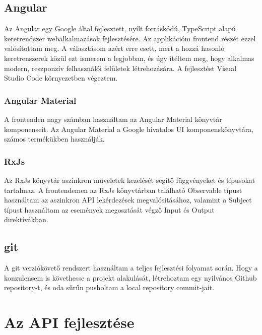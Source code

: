 \documentclass[a4paper,12pt]{report}
\theoremstyle{definition}
\theoremstyle{remark}
\begin{document}
\section{Angular}

Az Angular\cite{Angularwebsite} egy Google által fejlesztett, nyílt forráskódú, TypeScript alapú keretrendszer webalkalmazások fejlesztésére. Az applikációm frontend részét ezzel valósítottam meg. A választásom azért erre esett, mert a hozzá hasonló keretrenszerek közül ezt ismerem a legjobban, és úgy ítéltem meg, hogy alkalmas modern, reszponzív felhasználói felületek létrehozására. A fejlesztést Visual Studio Code\cite{VSCwebsite} környezetben végeztem.

	\subsection{Angular Material}

A frontenden nagy számban használtam az Angular Material\cite{Materialwebsite} könyvtár komponenseit. Az Angular Material a Google hivatalos UI komponenskönyvtára, számos termékükben használják.

	\subsection{RxJs}

Az RxJs\cite{Rxjswebsite} könyvtár aszinkron műveletek kezelését segítő függvényeket és típusokat tartalmaz. A frontendemen az RxJs könyvtárban található Observable típust használtam az aszinkron API lekérdezések megvalósításához, valamint a Subject típust használtam az események megosztását végző Input és Output direktívákban.

\section{git}

A git\cite{Gitwebsite} verziókövető rendszert használtam a teljes fejlesztési folyamat során. Hogy a konzulensem is követhesse a projekt alakulását, létrehoztam egy nyilvános Github\cite{GitHubwebsite} repository-t, és oda sűrűn pusholtam a local repository commit-jait.


\chapter{Az API fejlesztése}
\end{document}
